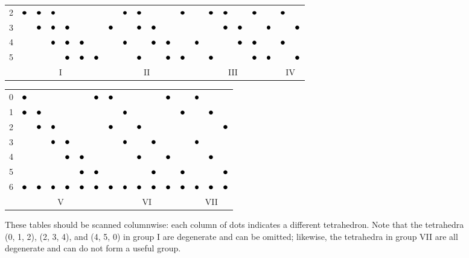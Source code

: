 \documentclass[eikonal.tex]{subfiles}
\begin{document}
\begin{figure}
{\begin{tabular}{c|cccccc|cccccc|cccccc|cc}
      2 & $\groupmarker$ & $\groupmarker$ & $\groupmarker$ & & & & & $\groupmarker$ & $\groupmarker$ & & & $\groupmarker$ & & $\groupmarker$ & $\groupmarker$ & & $\groupmarker$ & & $\groupmarker$ & \\
      3 & & $\groupmarker$ & $\groupmarker$ & $\groupmarker$ & & & $\groupmarker$ & & $\groupmarker$ & $\groupmarker$ & & & & & $\groupmarker$ & $\groupmarker$ & & $\groupmarker$ & & $\groupmarker$ \\
      4 & & & $\groupmarker$ & $\groupmarker$ & $\groupmarker$ & & & $\groupmarker$ & & $\groupmarker$ & $\groupmarker$ & & $\groupmarker$ & & & $\groupmarker$ & $\groupmarker$ & & $\groupmarker$ & \\
      5 & & & & $\groupmarker$ & $\groupmarker$ & $\groupmarker$ & & & $\groupmarker$ & & $\groupmarker$ & $\groupmarker$ & & $\groupmarker$ & & & $\groupmarker$ & $\groupmarker$ & & $\groupmarker$ \\
      \multicolumn{1}{c}{} & \multicolumn{6}{c}{I} & \multicolumn{6}{c}{II} & \multicolumn{6}{c}{III} & \multicolumn{2}{c}{IV}
    \end{tabular}%
    \vspace{1em}
    \begin{tabular}{c|cccccc|cccccc|ccc}
      0 & $\groupmarker$ & & & & & $\groupmarker$ & $\groupmarker$ & & & & $\groupmarker$ & & $\groupmarker$ & & \\
      1 & $\groupmarker$ & $\groupmarker$ & & & & & & $\groupmarker$ & & & & $\groupmarker$ & & $\groupmarker$ & \\
      2 & & $\groupmarker$ & $\groupmarker$ & & & & $\groupmarker$ & & $\groupmarker$ & & & & & & $\groupmarker$ \\
      3 & & & $\groupmarker$ & $\groupmarker$ & & & & $\groupmarker$ & & $\groupmarker$ & & & $\groupmarker$ & & \\
      4 & & & & $\groupmarker$ & $\groupmarker$ & & & & $\groupmarker$ & & $\groupmarker$ & & & $\groupmarker$ & \\
      5 & & & & & $\groupmarker$ & $\groupmarker$ & & & & $\groupmarker$ & & $\groupmarker$ & & & $\groupmarker$ \\
      6 & $\groupmarker$ & $\groupmarker$ & $\groupmarker$ & $\groupmarker$ & $\groupmarker$ & $\groupmarker$ & $\groupmarker$ & $\groupmarker$ & $\groupmarker$ & $\groupmarker$ & $\groupmarker$ & $\groupmarker$ & $\groupmarker$ & $\groupmarker$ & $\groupmarker$ \\
      \multicolumn{1}{c}{} & \multicolumn{6}{c}{V} & \multicolumn{6}{c}{VI} & \multicolumn{3}{c}{VII}
    \end{tabular}%
    \vspace{-0.5em}
  }
  \caption{These tables should be scanned columnwise: each column of
    dots indicates a different tetrahedron. Note that the tetrahedra
    (0, 1, 2), (2, 3, 4), and (4, 5, 0) in group I are degenerate and
    can be omitted; likewise, the tetrahedra in group VII are all
    degenerate and can do not form a useful
    group.}\label{fig:tetrahedra-groups}
\end{figure}
\end{document}
